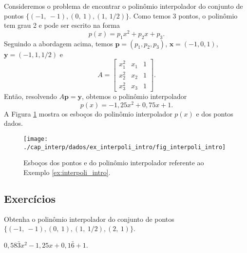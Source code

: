 \begin{ex}\label{ex:interpoli_intro}
  Consideremos o problema de encontrar o polinômio interpolador do conjunto de pontos $\{(-1,~-1), (0,~1), (1,~1/2)\}$. Como temos 3 pontos, o polinômio tem grau 2 e pode ser escrito na forma
  \begin{equation}
    p(x) = p_1x^2 + p_2x + p_3.
  \end{equation}
  Seguindo a abordagem acima, temos $\pmb{p}=(p_1, p_2, p_3)$, $\pmb{x} = (-1, 0, 1)$, $\pmb{y}=(-1, 1, 1/2)$ e
  \begin{equation}
    A =
    \begin{bmatrix}
      x_1^2 & x_1 & 1\\
      x_2^2 & x_2 & 1\\
      x_3^2 & x_3 & 1
    \end{bmatrix}.
  \end{equation}
  Então, resolvendo $A\pmb{p} = \pmb{y}$, obtemos o polinômio interpolador
  \begin{equation}
    p(x) = -1,25x^2 + 0,75x + 1.
  \end{equation}
A Figura \ref{fig:interpoli_intro} mostra os esboços do polinômio interpolador $p(x)$ e  dos pontos dados.

\begin{figure}[h!]
  \centering
  \texttt{[image: ./cap\_interp/dados/ex\_interpoli\_intro/fig\_interpoli\_intro]}
  \caption{Esboços dos pontos e do polinômio interpolador referente ao Exemplo \ref{ex:interpoli_intro}.}
  \label{fig:interpoli_intro}
\end{figure}

% 
\end{ex}

\subsection*{Exercícios}

\begin{exer}\label{exer:interpoli_intro1}
  Obtenha o polinômio interpolador do conjunto de pontos $\{(-1,~-1), (0,~1), (1,~1/2), (2,~1)\}$.
\end{exer}
\begin{resp}
$0,58\bar{3}x^2 - 1,25x + 0,1\bar{6} + 1$.  
\end{resp}

